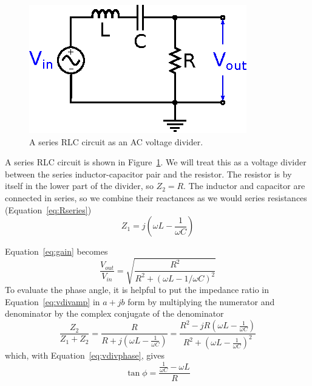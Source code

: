 \documentclass[11pt]{article}
\begin{document}
\begin{figure}[ht]
  \begin{center}
     \includegraphics{rlccircuit.eps}
    \caption{A series RLC circuit as an AC voltage divider.}
    \label{fig:rlccircuit}
  \end{center}
\end{figure}

A series RLC circuit is shown in Figure~\ref{fig:rlccircuit}. We will
treat this as a voltage divider between the series inductor-capacitor
pair and the resistor. The resistor is by itself in the lower part of
the divider, so $Z_2 = R$. The inductor and capacitor are connected in
series, so we combine their reactances as we would series resistances
(Equation~\ref{eq:Rseries})
\begin{equation}
  Z_1 = j \left( \omega L - \frac{1}{\omega C} \right)
\end{equation}

Equation~\ref{eq:gain} becomes
\begin{equation}
  \frac{V_{out}}{V_{in}} = \sqrt{\frac{R^2}{R^2 + (\omega L - 1/\omega
      C)^2}}
\end{equation}
To evaluate the phase angle, it is helpful to put the impedance ratio
in Equation~\ref{eq:vdivamp} in $a + jb$ form by multiplying the
numerator and denominator by the complex conjugate of the denominator
\begin{equation}
  \frac{Z_2}{Z_1 + Z_2} = \frac{R}{R + j \left( \omega L -
    \frac{1}{\omega C} \right)} = \frac{R^2 - j R \left( \omega L -
    \frac{1}{\omega C} \right)} {R^2 + \left( \omega L -
    \frac{1}{\omega C} \right)^2}
\end{equation}
which, with Equation~\ref{eq:vdivphase}, gives
\begin{equation}
  \tan \phi = \frac{\frac{1}{\omega C} - \omega L}{R}
\end{equation}
\end{document}
